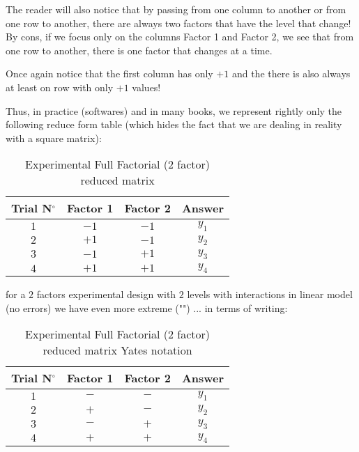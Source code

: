 	The reader will also notice that by passing from one column to another or from one row to another, there are always two factors that have the level that change! By cons, if we focus only on the columns Factor 1 and Factor 2, we see that from one row to another, there is one factor that changes at a time.
	\begin{tcolorbox}[title=Remark,colframe=black,arc=10pt]
	Once again notice that the first column has only $+1$ and the there is also always at least on row with only $+1$ values!
	\end{tcolorbox}
	Thus, in practice (softwares) and in many books, we represent rightly only the following reduce form table (which hides the fact that we are dealing in reality with a square matrix):
	\begin{table}[H]\centering
	\begin{center}
			\begin{tabular}{|c|c|c|c|}
				\hline
				\multicolumn{1}{c}{\cellcolor{black!30}\textbf{Trial N${}^\circ$}} & 
  \multicolumn{1}{c}{\cellcolor{black!30}\textbf{Factor 1}} & 
  \multicolumn{1}{c}{\cellcolor{black!30}\textbf{Factor 2}} & 
  \multicolumn{1}{c}{\cellcolor{black!30}\textbf{Answer}} \\ \hline
				 $1$ &  $-1$ & $-1$ &  $y_1$\\ \hline
				 $2$ &  $+1$ & $-1$ &  $y_2$\\ \hline
				 $3$ &  $-1$ & $+1$ &  $y_3$\\ \hline
				 $4$ &  $+1$ & $+1$ &  $y_4$\\ \hline
		\end{tabular}
	\end{center}
	\caption{Experimental Full Factorial ($2$ factor) reduced matrix}
	\end{table}
	for a $2$ factors experimental design with $2$ levels with interactions in linear model (no errors) we have even more extreme ("") ... in terms of writing:
	\begin{table}[H]\centering
	\begin{center}
			\begin{tabular}{|c|c|c|c|}
				\hline
				\multicolumn{1}{c}{\cellcolor{black!30}\textbf{Trial N${}^\circ$}} & 
  \multicolumn{1}{c}{\cellcolor{black!30}\textbf{Factor 1}} & 
  \multicolumn{1}{c}{\cellcolor{black!30}\textbf{Factor 2}} & 
  \multicolumn{1}{c}{\cellcolor{black!30}\textbf{Answer}} \\ \hline
				 $1$ &  $-$ & $-$ &  $y_1$\\ \hline
				 $2$ &  $+$ & $-$ &  $y_2$\\ \hline
				 $3$ &  $-$ & $+$ &  $y_3$\\ \hline
				 $4$ &  $+$ & $+$ &  $y_4$\\ \hline
		\end{tabular}
	\end{center}
	\caption{Experimental Full Factorial ($2$ factor) reduced matrix Yates notation}
	\end{table}
